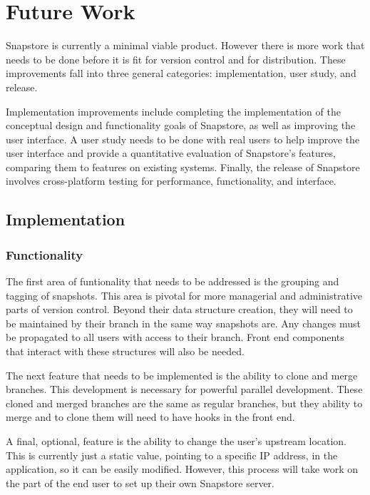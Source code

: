 \chapter{Future Work}

Snapstore is currently a minimal viable product. However there is more work that needs to be done before it is fit for version control and for distribution. These improvements fall into three general categories: implementation, user study, and release. 

Implementation improvements include completing the implementation of the conceptual design and functionality goals of Snapstore, as well as improving the user interface. A user study needs to be done with real users to help improve the user interface and provide a quantitative evaluation of Snapstore's features, comparing them to features on existing systems. Finally, the release of Snapstore involves cross-platform testing for performance, functionality, and interface.

\section{Implementation}

\subsection{Functionality}

The first area of funtionality that needs to be addressed is the grouping and tagging of snapshots. This area is pivotal for more managerial and administrative parts of version control. Beyond their data structure creation, they will need to be maintained by their branch in the same way snapshots are. Any changes must be propagated to all users with access to their branch. Front end components that interact with these structures will also be needed.

The next feature that needs to be implemented is the ability to clone and merge branches. This development is necessary for powerful parallel development. These cloned and merged branches are the same as regular branches, but they ability to merge and to clone them will need to have hooks in the front end.

A final, optional, feature is the ability to change the user's upstream location. This is currently just a static value, pointing to a specific IP address, in the application, so it can be easily modified. However, this process will take work on the part of the end user to set up their own Snapstore server.

